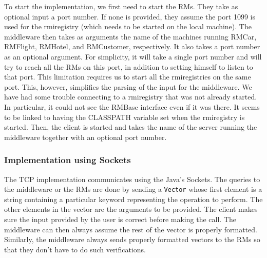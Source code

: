 \documentclass[12pt]{article}
\theoremstyle{plain}%
\theoremstyle{definition}
\theoremstyle{remark}
\newcommand{\java}[1]{{\lstinline!#1!}}
\begin{document}
To start the implementation, we first need to start the RMs. They take
as optional input a port number. If none is provided, they assume the
port 1099 is used for the rmiregistry (which needs to be started on
the local machine). The middleware then takes as arguments the name of
the machines running RMCar, RMFlight, RMHotel, and RMCustomer,
respectively. It also takes a port number as an optional argument. For
simplicity, it will take a single port number and will try to reach
all the RMs on this port, in addition to setting himself to listen to
that port. This limitation requires us to start all the rmiregistries
on the same port. This, however, simplifies the parsing of the input
for the middleware. We have had some trouble connecting to a
rmiregistry that was not already started. In particular, it could not
see the RMBase interface even if it was there. It seems to be linked to
having the CLASSPATH variable set when the rmiregistry is started.
Then, the client is started and takes the name of the server running
the middleware together with an optional port number.

\subsubsection*{Implementation using Sockets}
The TCP implementation communicates using the Java's Sockets. The
queries to the middleware or the RMs are done by sending a
\java{Vector} whose first element is a string containing a particular
keyword representing the operation to perform. The other elements in
the vector are the arguments to be provided. The client makes sure the
input provided by the user is correct before making the call. The
middleware can then always assume the rest of the vector is properly
formatted. Similarly, the middleware always sends properly formatted
vectors to the RMs so that they don't have to do such verifications. 
\end{document}
